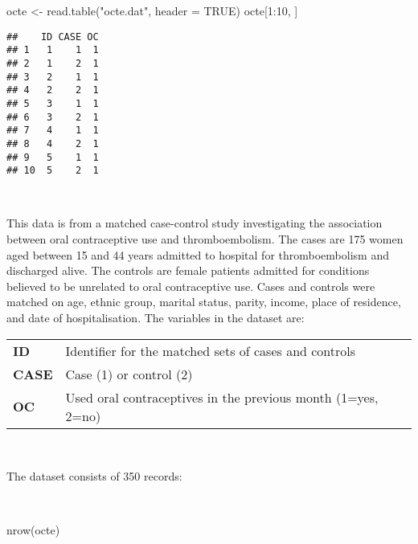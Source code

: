 \documentclass[
  12pt,
  a4paper]{book}
\newenvironment{Shaded}{\begin{snugshade}}{\end{snugshade}}
\newcommand{\AttributeTok}[1]{\textcolor[rgb]{0.77,0.63,0.00}{#1}}
\newcommand{\ConstantTok}[1]{\textcolor[rgb]{0.00,0.00,0.00}{#1}}
\newcommand{\DecValTok}[1]{\textcolor[rgb]{0.00,0.00,0.81}{#1}}
\newcommand{\FunctionTok}[1]{\textcolor[rgb]{0.00,0.00,0.00}{#1}}
\newcommand{\NormalTok}[1]{#1}
\newcommand{\OtherTok}[1]{\textcolor[rgb]{0.56,0.35,0.01}{#1}}
\newcommand{\SpecialCharTok}[1]{\textcolor[rgb]{0.00,0.00,0.00}{#1}}
\newcommand{\StringTok}[1]{\textcolor[rgb]{0.31,0.60,0.02}{#1}}
\begin{document}
\begin{Shaded}
\begin{Highlighting}[]
\NormalTok{octe }\OtherTok{\textless{}{-}} \FunctionTok{read.table}\NormalTok{(}\StringTok{"octe.dat"}\NormalTok{, }\AttributeTok{header =} \ConstantTok{TRUE}\NormalTok{)}
\NormalTok{octe[}\DecValTok{1}\SpecialCharTok{:}\DecValTok{10}\NormalTok{, ]}
\end{Highlighting}
\end{Shaded}

\begin{verbatim}
##    ID CASE OC
## 1   1    1  1
## 2   1    2  1
## 3   2    1  1
## 4   2    2  1
## 5   3    1  1
## 6   3    2  1
## 7   4    1  1
## 8   4    2  1
## 9   5    1  1
## 10  5    2  1
\end{verbatim}

~

This data is from a matched case-control study investigating the association between oral contraceptive use and thromboembolism. The cases are 175 women aged between 15 and 44 years admitted to hospital for thromboembolism and discharged alive. The controls are female patients admitted for conditions believed to be unrelated to oral contraceptive use. Cases and controls were matched on age, ethnic group, marital status, parity, income, place of residence, and date of hospitalisation. The variables in the dataset are:

\newpage

\begin{longtable}[]{@{}
  >{\raggedright\arraybackslash}p{}
  >{\raggedright\arraybackslash}p{}@{}}
\toprule
\endhead
\textbf{ID} & Identifier for the matched sets of cases and controls \\
\textbf{CASE} & Case (1) or control (2) \\
\textbf{OC} & Used oral contraceptives in the previous month (1=yes, 2=no) \\
\bottomrule
\end{longtable}

~

The dataset consists of 350 records:

~

\begin{Shaded}
\begin{Highlighting}[]
\FunctionTok{nrow}\NormalTok{(octe)}
\end{Highlighting}
\end{Shaded}
\end{document}
